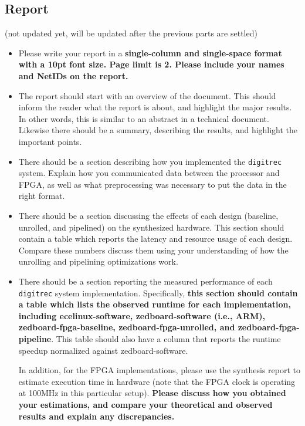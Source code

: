 \documentclass[paper=letter, fontsize=10pt]{scrartcl} %
\numberwithin{equation}{section} %
\numberwithin{figure}{section} %
\numberwithin{table}{section} %
\begin{document}
\subsection{Report}
(not updated yet, will be updated after the previous parts are settled)
\begin{itemize}
\item Please write your report in a \textbf{single-column and single-space format with a 10pt font size. Page limit is 2. Please include your names and NetIDs on the report.}

\item The report should start with an overview of the document. This should inform the reader what the report is about, and highlight the major results. In other words, this is similar to an abstract in a technical document. Likewise there should be a summary, describing the results, and highlight the important points.

\item There should be a section describing how you implemented the \texttt{digitrec} system. Explain how you communicated data between the processor and FPGA, as well as what preprocessing was necessary to put the data in the right format.

\item There should be a section discussing the effects of each design (baseline, unrolled, and pipelined) on the synthesized hardware. This section should contain a table which reports the latency and resource usage of each design. Compare these numbers discuss them using your understanding of how the unrolling and pipelining optimizations work.
  
\item There should be a section reporting the measured performance of each \texttt{digitrec} system implementation. Specifically, \textbf{this section should contain a table which lists the observed runtime for each implementation, including ecelinux-software, zedboard-software (i.e., ARM), zedboard-fpga-baseline, zedboard-fpga-unrolled, and zedboard-fpga-pipeline}. This table should also have a column that reports the runtime speedup normalized against zedboard-software. 

In addition, for the FPGA implementations, please use the synthesis report to estimate execution time in hardware (note that the FPGA clock is operating at 100MHz in this particular setup). \textbf{Please discuss how you obtained your estimations, and compare your theoretical and observed results and explain any discrepancies.} 


\end{itemize}
\end{document}
